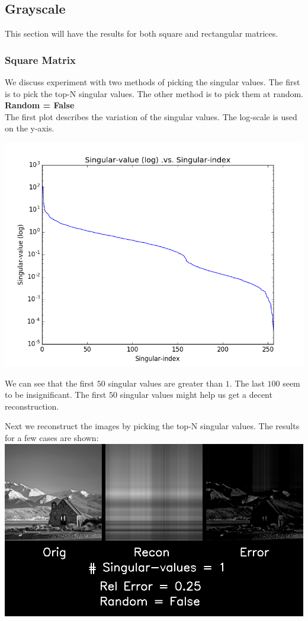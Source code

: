 \documentclass{article}
\begin{document}
\subsection{Grayscale}
This section will have the results for both square and rectangular matrices.

\subsubsection{Square Matrix}

We discuss experiment with two methods of picking the singular values. The first is to pick the top-N singular values. The other method is to pick them at random.\\

\textbf{Random = False}\\

The first plot describes the variation of the singular values. The log-scale is used on the y-axis.

\includegraphics[width=\textwidth]{SVD/a/Square/False/singular.png}

We can see that the first $50$ singular values are greater than $1$. The last $100$ seem to be insignificant. The first $50$ singular values might help us get a decent reconstruction.

Next we reconstruct the images by picking the top-N singular values. The results for a few cases are shown:\\

\includegraphics[width=\textwidth]{SVD/a/Square/False/recon0001.png}\\
\end{document}
